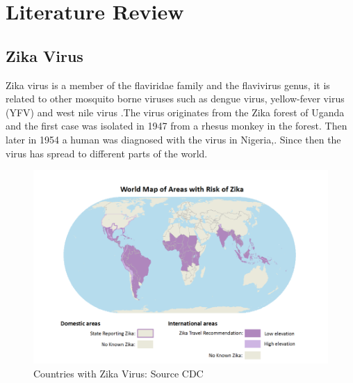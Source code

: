 \chapter{Literature Review}
\section{Zika Virus}
Zika virus is a member of the flaviridae family
and the flavivirus genus, it is related to other mosquito borne viruses such as dengue virus, yellow-fever  virus (YFV)  and west nile virus \citep{doi}.The virus originates from the Zika forest of Uganda and the first case was isolated in 1947 from a rhesus monkey in the forest. Then later in 1954 a human was diagnosed with the virus in Nigeria,\citep{2015zika}. Since then the virus has spread to different parts of the world. 




\begin{figure}[h!]
\centering
\includegraphics[scale=0.5]{images/map_zika.png} 
\caption{Countries with Zika Virus: Source CDC}\label{fig 1}
\end{figure}


